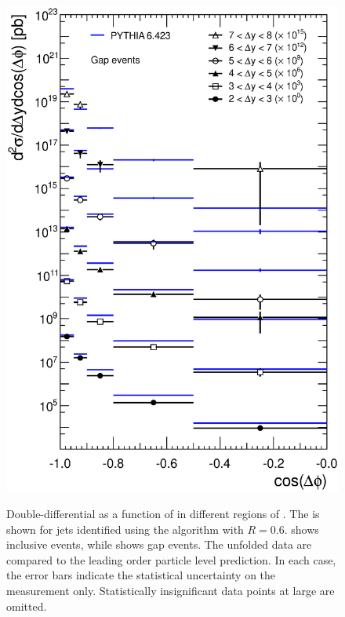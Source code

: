 \begin{figure}[htpb]
{    \includegraphics[width=\smallfigwidth]{chapters/azimuthal-decorrelation/Gap.CrossSection.all_dy_slices.CosDeltaPhiBins.eps}
    \label{fig:azimuthal-decorrelation:cross-section_CosDeltaPhi_gap}}
  \caption{Double-differential \xs as a function of \cosDPhi in different regions of \DeltaY.
           The \xs is shown for jets identified using the \akt algorithm with
           $R=0.6$. \protect{}
           shows inclusive events, while \protect{}
           shows gap events. The unfolded data are compared to the leading order particle
           level  prediction. In each case, the error bars
           indicate the statistical uncertainty on the measurement only. Statistically
           insignificant data points at large \DeltaY are omitted.}
  \label{fig:azimuthal-decorrelation:cross-sections_cosDPhi}
\end{figure}

